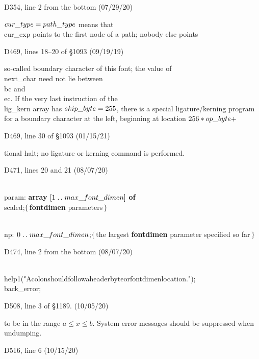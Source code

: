 \bugonpage D354, line 2 from the bottom (07/29/20)

\tenpoint\noindent
$\\{cur\_type}=\\{path\_type}$ means that \\{cur\_exp} points to the first
node of
a path; nobody else points\cutpar

\bugonpage D469, lines 18--20 of \S1093 (09/19/19)

\tenpoint\noindent
so-called boundary character of this font;
the value of \\{next\_char} need not lie between \\{bc} and~\\{ec}.
If the very last instruction of the \\{lig\_kern} array has $\\{skip%
\_byte}=255$,
there is a special ligature/kerning program for a boundary character at the
left, beginning at location $256\ast\\{op\_byte}+$\cutpar

\bugonpage D469, line 30 of \S1093 (01/15/21)

\tenpoint\noindent
tional halt; no ligature or kerning command is performed.

\bugonpage D471, lines 20 and 21 (08/07/20)

\ninepoint\noindent
\\{param}: {\bf array} $[1\mathrel{.\,.}\\{max\_font\_dimen}]$ {\bf of}
\\{scaled};\quad$\{\,${\bf fontdimen} parameters$\,\}$\par\noindent
\\{np}: $0\mathrel{.\,.}\\{max\_font\_dimen}$;\quad$\{\,$the largest {\bf fontdimen} parameter
specified so far$\,\}$

\bugonpage D474, line 2 from the bottom (08/07/20)

\ninepoint\noindent\quad\qquad
\\{help1}(\.{"A\]colon\]should\]follow\]a\]headerbyte\]or\]fontdimen\]location."});
\\{back\_error};

\bugonpage D508, line 3 of \S1189. (10/05/20)

\tenpoint\noindent
to be in the range $a\le x\le b$.
System error messages should be suppressed when undumping.

\bugonpage D516, line 6 (10/15/20)

